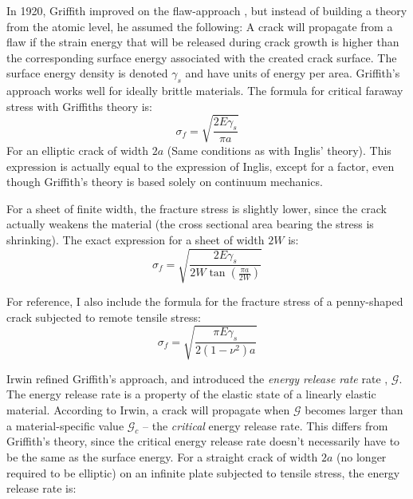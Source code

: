 In 1920, Griffith improved on the flaw-approach \cite{griffith1920phenomena}, but instead of building a theory from the atomic level, he assumed the following: A crack will propagate from a flaw if the strain energy that will be released during crack growth is higher than the corresponding surface energy associated with the created crack surface. The surface energy density is denoted $\gamma_s$ and have units of energy per area. Griffith's approach works well for ideally brittle materials. The formula for critical faraway stress with Griffiths theory is:
\begin{equation}
	\sigma_f = \sqrt{\frac{2E\gamma_s}{\pi a}}
\end{equation}
For an elliptic crack of width $2a$ (Same conditions as with Inglis' theory). This expression is actually equal to the expression of Inglis, except for a factor, even though Griffith's theory is based solely on continuum mechanics.

For a sheet of finite width, the fracture stress is slightly lower, since the crack actually weakens the material (the cross sectional area bearing the stress is shrinking). The exact expression for a sheet of width $2W$ is:
%
 \begin{equation}
 	\sigma_f = \sqrt{\frac{2E\gamma_s}{2W\tan\left( \frac{\pi a}{2W}\right)}}
 	\label{eq:griffith_finite_sheet}
 \end{equation}

For reference, I also include the formula for the fracture stress of a penny-shaped crack subjected to remote tensile stress:
\begin{equation}
	\sigma_f = \sqrt{\frac{\pi E \gamma_s }{2(1-\nu^2)a}}
\end{equation}
 

 Irwin refined Griffith's approach, and introduced the \emph{energy release rate} rate \cite{irwin2onset}, $\mathcal{G}$. The energy release rate is a property of the elastic state of a linearly elastic material. According to Irwin, a crack will propagate when $\mathcal{G}$ becomes larger than a material-specific value $\mathcal{G}_c$ -- the \emph{critical} energy release rate. This differs from Griffith's theory, since the critical energy release rate doesn't necessarily have to be the same as the surface energy. For a straight crack of width $2a$ (no longer required to be elliptic) on an infinite plate subjected to tensile stress, the energy release rate is:

